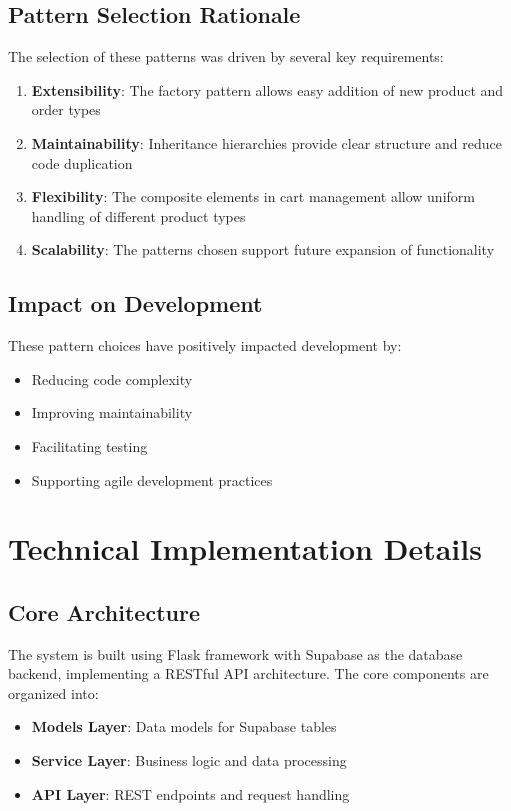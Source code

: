 \documentclass[12pt,a4paper]{article}
\begin{document}
\subsection{Pattern Selection Rationale}

The selection of these patterns was driven by several key requirements:

\begin{enumerate}
    \item \textbf{Extensibility}: The factory pattern allows easy addition of new product and order types
    \item \textbf{Maintainability}: Inheritance hierarchies provide clear structure and reduce code duplication
    \item \textbf{Flexibility}: The composite elements in cart management allow uniform handling of different product types
    \item \textbf{Scalability}: The patterns chosen support future expansion of functionality
\end{enumerate}

\subsection{Impact on Development}

These pattern choices have positively impacted development by:
\begin{itemize}
    \item Reducing code complexity
    \item Improving maintainability
    \item Facilitating testing
    \item Supporting agile development practices
\end{itemize}
\section{Technical Implementation Details}

\subsection{Core Architecture}
The system is built using Flask framework with Supabase as the database backend, implementing a RESTful API architecture. The core components are organized into:

\begin{itemize}
    \item \textbf{Models Layer}: Data models for Supabase tables
    \item \textbf{Service Layer}: Business logic and data processing
    \item \textbf{API Layer}: REST endpoints and request handling
\end{itemize}
\end{document}
